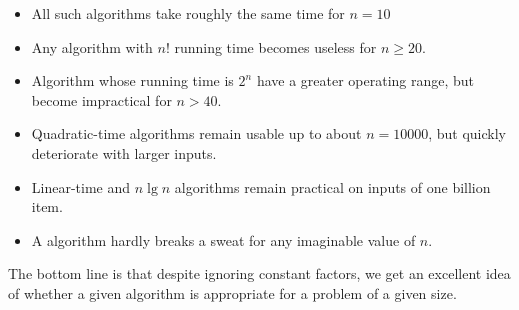 		\begin{itemize}
			\item All such algorithms take roughly the same time for $n = 10$
			\item Any algorithm with $n!$ running time becomes useless for $n\ge 20$.
			\item Algorithm whose running time is $2^n$ have a greater operating range, but become impractical for $n>40$.
			\item Quadratic-time algorithms remain usable up to about $n = \num{10000}$, but quickly deteriorate with larger inputs.
			\item Linear-time and $n \lg n$ algorithms remain practical on inputs of one billion item.
			\item A  algorithm hardly breaks a sweat for any imaginable value of $n$.
		\end{itemize}
	
	The bottom line is that despite ignoring constant factors, we get an excellent idea of whether a given algorithm is appropriate for a problem of a given size. 
	
